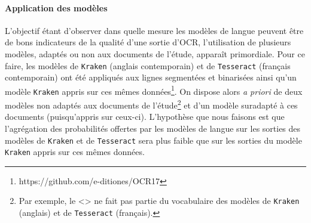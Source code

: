 \documentclass[10pt,twoside]{article}
\newcommand{\textlongs}{{\fontencoding{TS1}\fontfamily{lmr}\selectfont\char115}}
\begin{document}
        \paragraph{Application des modèles}
        L'objectif étant d'observer dans quelle mesure les modèles de langue peuvent être de bons indicateurs de la
        qualité d'une sortie d'OCR, l'utilisation de plusieurs modèles, adaptés ou non aux documents de l'étude,
        apparaît primordiale. Pour ce faire, les modèles de \verb!Kraken! (anglais contemporain) et de \verb!Tesseract! (français contemporain) ont été appliqués
        aux lignes segmentées et binarisées ainsi qu'un modèle \verb!Kraken! appris sur ces mêmes données\footnote{https://github.com/e-ditiones/OCR17}. 
        On dispose alors \textit{a priori} de deux modèles non adaptés aux documents de l'étude\footnote{Par exemple, le 
        <\textlongs > ne fait pas partie du vocabulaire des modèles de \verb!Kraken! (anglais) et de \verb!Tesseract! (français).} 
        et d'un modèle suradapté à ces documents (puisqu'appris sur ceux-ci). L'hypothèse que nous faisons est que 
        l'agrégation des probabilités offertes par les modèles de langue sur les sorties des modèles de 
        \verb!Kraken! et de \verb!Tesseract! sera plus faible que sur les sorties du modèle \verb!Kraken! appris sur ces 
        mêmes données. 
\end{document}
